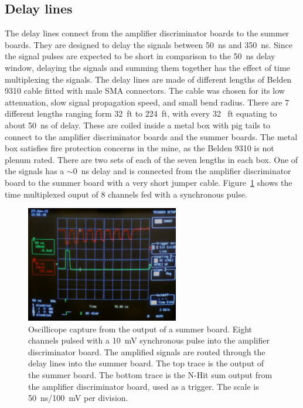 \documentclass[pdftex]{JINST}
\begin{document}
\subsection{Delay lines}
\label{sec:Delay}
%
The delay lines connect from the amplifier discriminator boards to the
summer boards. They are designed to delay the signals between 50~ns and 350~ns.
Since the signal pulses are expected to be short in
comparison to the 50~ns delay window, delaying the signals and summing
them together has the effect of time multiplexing the signals. The
delay lines are made of different lengths of Belden 9310 cable fitted
with male SMA connectors. The cable was chosen for its low
attenuation, slow signal propagation speed, and small bend radius.
There are 7 different lengths ranging form 32~ft to 224~ft, with every 32~ ft
equating to about 50~ns of delay. These are coiled inside a metal box
with pig tails to connect to the amplifier discriminator boards and
the summer boards. The metal box satisfies fire protection concerns
in the mine, as the Belden 9310 is not plenum rated. There are two
sets of each of the seven lengths in each box. One of the signals has
a $\sim$0~ns delay and is connected from the amplifier discriminator board to
the summer board with a very short jumper cable. Figure~\ref{fig:multipulse}
shows the time multiplexed ouput of 8 channels fed with a synchronous pulse.

\begin{figure}[ht]
\begin{center}
	\includegraphics[height=2in, keepaspectratio=true]{graphics/delaypulse.jpg}
	\caption{Oscillicope capture from the output of a summer board. Eight channels
		pulsed with a 10~mV synchronous pulse into the amplifier discriminator board. The amplified
		signals are routed through the delay lines into the summer board. The top trace is
		the output of the summer board. The bottom trace is the N-Hit sum output from the
		amplifier discriminator board, used as a trigger.  The scale is 50~ns/100~mV per division.
\label{fig:multipulse}}
\end{center}
\end{figure}
\end{document}

